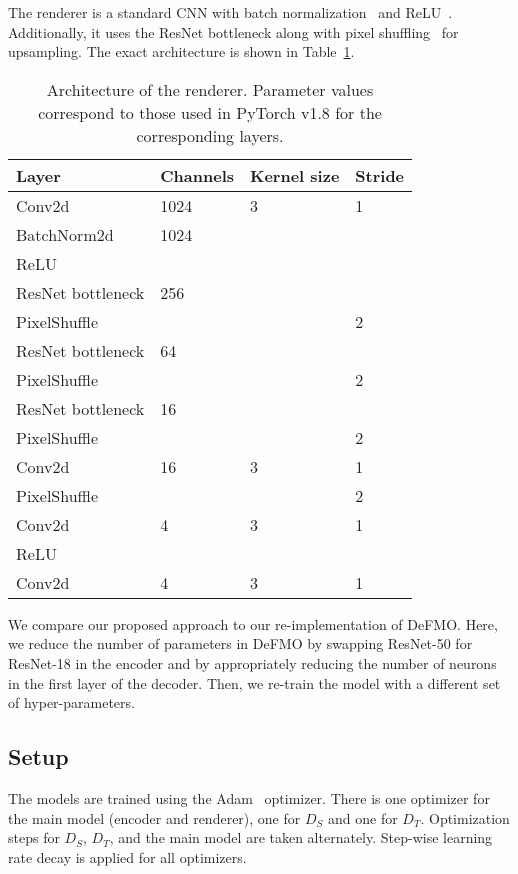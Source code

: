     The renderer is a standard CNN with batch normalization~\citep{batch-norm} and ReLU~\citep{relu}.
    Additionally, it uses the ResNet bottleneck along with pixel shuffling~\citep{pixelshuffle} for upsampling.
    The exact architecture is shown in Table~\ref{tab:renderer-arch}.

    \begin{table}
        \caption{
            Architecture of the renderer.
            Parameter values correspond to those used in PyTorch v1.8 for the corresponding layers.
        }%
        \label{tab:renderer-arch}
        \centering
        \begin{tabular}{llll}
            \toprule
            Layer & Channels & Kernel size & Stride\\
            \midrule
            Conv2d & 1024 & 3 & 1\\
            BatchNorm2d & 1024\\
            ReLU\\
            ResNet bottleneck & 256\\
            PixelShuffle &&& 2\\
            ResNet bottleneck & 64\\
            PixelShuffle &&& 2\\
            ResNet bottleneck & 16\\
            PixelShuffle &&& 2\\
            Conv2d & 16 & 3 & 1\\
            PixelShuffle &&& 2\\
            Conv2d & 4 & 3 & 1\\
            ReLU\\
            Conv2d & 4 & 3 & 1\\
            \bottomrule
        \end{tabular}
    \end{table}

    We compare our proposed approach to our re-implementation of DeFMO.\@
    Here, we reduce the number of parameters in DeFMO by swapping ResNet-50 for ResNet-18 in the encoder and by appropriately reducing the number of neurons in the first layer of the decoder.
    Then, we re-train the model with a different set of hyper-parameters.

\subsection{Setup}
    The models are trained using the Adam~\citep{adam} optimizer.
    There is one optimizer for the main model (encoder and renderer), one for $D_S$ and one for $D_T$.
    Optimization steps for $D_S$, $D_T$, and the main model are taken alternately.
    Step-wise learning rate decay is applied for all optimizers.

